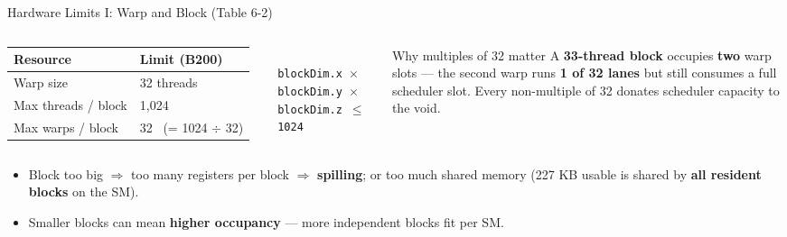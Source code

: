 \documentclass[aspectratio=169]{beamer}
\newcommand{\kw}[1]{\textbf{\textcolor{kwblue}{#1}}}
\begin{document}
\begin{frame}{Hardware Limits I: Warp and Block (Table 6-2)}
  \begin{columns}[c]
    {\small
    \begin{tabular}{@{}ll@{}}
      \toprule
      \textbf{Resource} & \textbf{Limit (B200)} \\
      \midrule
      Warp size & 32 threads \\
      Max threads / block & 1{,}024 \\
      Max warps / block & 32 \ (= 1024 $\div$ 32) \\
      \bottomrule
    \end{tabular}}\\[6pt]
    {\scriptsize \texttt{blockDim.x $\times$ blockDim.y $\times$ blockDim.z $\leq$ 1024}}
    \begin{block}{Why multiples of 32 matter}
      \small A \kw{33-thread block} occupies \kw{two} warp slots --- the second warp runs
      \kw{1 of 32 lanes} but still consumes a full scheduler slot. Every non-multiple of 32
      donates scheduler capacity to the void.
    \end{block}
  \end{columns}
  \medskip
  \begin{itemize}
    \item Block too big $\Rightarrow$ too many registers per block $\Rightarrow$ \kw{spilling};
          or too much shared memory (227 KB usable is shared by \kw{all resident blocks} on the SM).
    \item Smaller blocks can mean \kw{higher occupancy} --- more independent blocks fit per SM.
  \end{itemize}
\end{frame}
\end{document}
